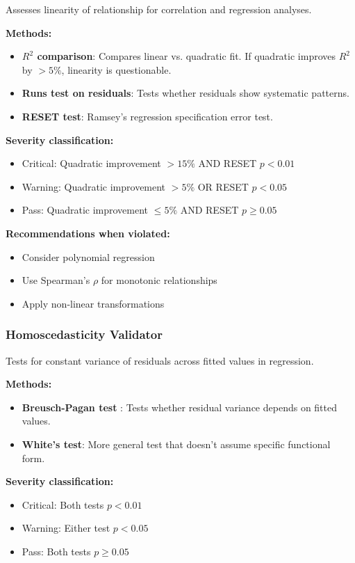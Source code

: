 \documentclass[article]{jss}
\begin{document}
Assesses linearity of relationship for correlation and regression analyses.

\textbf{Methods:}
\begin{itemize}
\item \textbf{$R^2$ comparison}: Compares linear vs. quadratic fit. If quadratic improves $R^2$ by $> 5\%$, linearity is questionable.
\item \textbf{Runs test on residuals}: Tests whether residuals show systematic patterns.
\item \textbf{RESET test}: Ramsey's regression specification error test.
\end{itemize}

\textbf{Severity classification:}
\begin{itemize}
\item Critical: Quadratic improvement $> 15\%$ AND RESET $p < 0.01$
\item Warning: Quadratic improvement $> 5\%$ OR RESET $p < 0.05$
\item Pass: Quadratic improvement $\leq 5\%$ AND RESET $p \geq 0.05$
\end{itemize}

\textbf{Recommendations when violated:}
\begin{itemize}
\item Consider polynomial regression
\item Use Spearman's $\rho$ for monotonic relationships
\item Apply non-linear transformations
\end{itemize}

\subsubsection{Homoscedasticity Validator}

Tests for constant variance of residuals across fitted values in regression.

\textbf{Methods:}
\begin{itemize}
\item \textbf{Breusch-Pagan test} \citep{breusch1979simple}: Tests whether residual variance depends on fitted values.
\item \textbf{White's test}: More general test that doesn't assume specific functional form.
\end{itemize}

\textbf{Severity classification:}
\begin{itemize}
\item Critical: Both tests $p < 0.01$
\item Warning: Either test $p < 0.05$
\item Pass: Both tests $p \geq 0.05$
\end{itemize}
\end{document}
